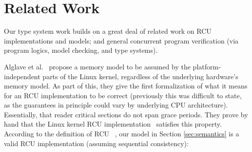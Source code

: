 \section{Related Work}
\label{sec:relatedwork}
Our type system work builds on a great deal of related work on RCU implementations and models; and general concurrent program verification (via program logics, model checking, and type systems).

Alglave et al.~\cite{Alglave:2018:FSC:3173162.3177156} propose a memory model to be assumed by the platform-independent parts of the Linux kernel, regardless of the underlying hardware's memory model.
As part of this, they give the first formalization of what it means for an RCU implementation to be correct (previously this was difficult to state, as the guarantees in principle could vary by underlying CPU architecture). Essentially, that reader critical sections do not span grace periods. They prove by hand that the Linux kernel RCU implementation~\cite{DBLP:conf/cav/AlglaveKT13,abssem} satisfies this property. According to the definition of \textsf{RCU} ~\cite{abssem,Alglave:2018:FSC:3173162.3177156}, our model in Section \ref{sec:semantics} is a valid RCU implementation (assuming sequential consistency):
